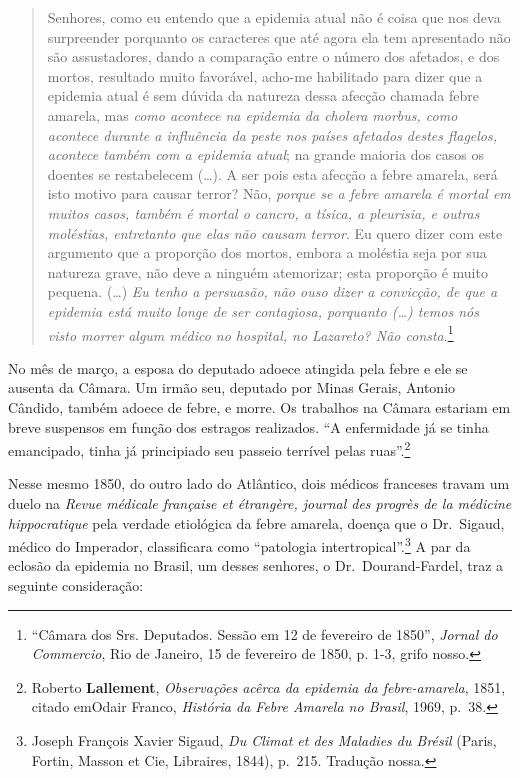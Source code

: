 \begin{quote}
Senhores, como eu entendo que a epidemia atual não é coisa que nos deva
surpreender porquanto os caracteres que até agora ela tem apresentado
não são assustadores, dando a comparação entre o número dos afetados, e
dos mortos, resultado muito favorável, acho-me habilitado para dizer que
a epidemia atual é sem dúvida da natureza dessa afecção chamada febre
amarela, mas \textit{como acontece na epidemia da cholera morbus, como
acontece durante a influência da peste nos países afetados destes
flagelos, acontece também com a epidemia atual}; na grande maioria dos
casos os doentes se restabelecem (\dots{}). A ser pois esta afecção a febre
amarela, será isto motivo para causar terror? Não, \textit{porque se a
febre amarela é mortal em muitos casos, também é mortal o cancro, a
tísica, a pleurisia, e outras moléstias, entretanto que elas não causam
terror}. Eu quero dizer com este argumento que a proporção dos mortos,
embora a moléstia seja por sua natureza grave, não deve a ninguém
atemorizar; esta proporção é muito pequena. (\dots{}) \textit{Eu tenho a
persuasão, não ouso dizer a convicção, de que a epidemia está muito
longe de ser contagiosa, porquanto (\ldots{}) temos nós visto morrer
algum médico no hospital, no Lazareto? Não consta}.\footnote{``Câmara
  dos Srs. Deputados. Sessão em 12 de fevereiro de 1850'', \textit{Jornal
  do Commercio}, Rio de Janeiro, 15 de fevereiro de 1850, p. 1-3, grifo
  nosso.}
\end{quote}

No mês de março, a esposa do deputado adoece atingida pela febre e ele
se ausenta da Câmara. Um irmão seu, deputado por Minas Gerais, Antonio
Cândido, também adoece de febre, e morre. Os trabalhos na Câmara
estariam em breve suspensos em função dos estragos realizados. ``A
enfermidade já se tinha emancipado, tinha já principiado seu passeio
terrível pelas ruas''.\footnote{Roberto \textbf{Lallement},
  \textit{Observações acêrca da epidemia da febre-amarela}, 1851, citado
  emOdair Franco, \textit{História da Febre Amarela no Brasil}, 1969,
  p.~38.}

Nesse mesmo 1850, do outro lado do Atlântico, dois médicos franceses
travam um duelo na \textit{Revue médicale française et étrangère, journal
des progrès de la médicine hippocratique} pela verdade etiológica da
febre amarela, doença que o Dr.~Sigaud, médico do Imperador,
classificara como ``patologia intertropical''.\footnote{Joseph François
  Xavier Sigaud, \textit{Du Climat et des Maladies du Brésil} (Paris,
  Fortin, Masson et Cie, Libraires, 1844), p.~215. Tradução nossa.} A
par da eclosão da epidemia no Brasil, um desses senhores, o
Dr.~Dourand-Fardel, traz a seguinte consideração:

